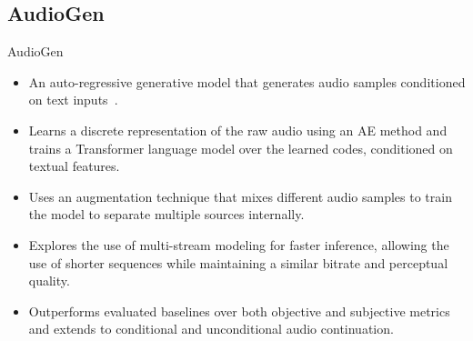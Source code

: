 \subsection{AudioGen}
\begin{frame}{AudioGen}
    \begin{itemize}
        \item An auto-regressive generative model that generates audio samples conditioned on text inputs~\cite{kreuk_audiogen_2023}.
        \item Learns a discrete representation of the raw audio using an AE method and trains a Transformer language model over the learned codes, conditioned on textual features.
        \item Uses an augmentation technique that mixes different audio samples to train the model to separate multiple sources internally.
        \item Explores the use of multi-stream modeling for faster inference, allowing the use of shorter sequences while maintaining a similar bitrate and perceptual quality.
        \item Outperforms evaluated baselines over both objective and subjective metrics and extends to conditional and unconditional audio continuation.
    \end{itemize}
\end{frame}
